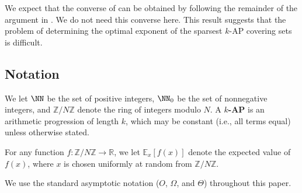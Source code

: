 \documentclass[11pt,reqno]{amsart}
\renewcommand{\textbf}[1]{{\bfseries\boldmath #1}}
\newcommand{\vocab}[1]{\textbf{\textcolor{BrickRed}{\boldmath #1}}}
\begin{document}
We expect that the converse of  
can be obtained by following the remainder of the argument in 
\cite[\S 2]{arithmetic_kakeya}. We do not need this converse here.
This result suggests that the problem of determining the 
optimal exponent of the sparsest $k$-AP covering sets is difficult.


\subsection{Notation}

We let $\NN$ be the set of positive integers, 
$\NN_0$ be the set of nonnegative integers,
and $\mathbb Z/N\mathbb Z$ denote the ring of integers modulo $N$.
A \vocab{$k$-AP} is an arithmetic progression of length $k$, 
which may be constant (i.e., all terms equal)
unless otherwise stated.


For any function $f : \mathbb Z/N\mathbb Z\to \mathbb R$,
we let $\mathbb E_x[f(x)]$ denote the expected value 
of $f(x)$, where $x$ is chosen uniformly at 
random from $\mathbb Z/N\mathbb Z$.

We use the standard asymptotic notation
($O$, $\Omega$, and $\Theta$) throughout this paper.
\end{document}
